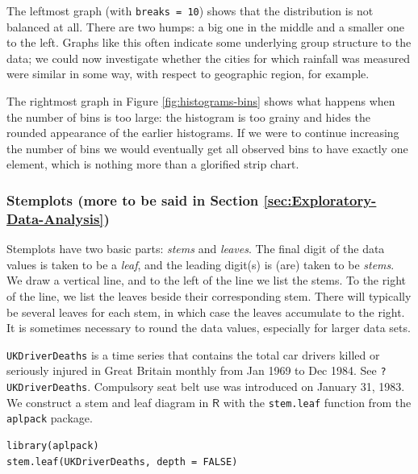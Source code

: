 \documentclass[captions=tableheading]{scrbook}
\begin{document}
\begin{example}
The leftmost graph (with \texttt{breaks = 10}) shows that the distribution is not balanced at all. There are two humps: a big one in the middle and a smaller one to the left. Graphs like this often indicate some underlying group structure to the data; we could now investigate whether the cities for which rainfall was measured were similar in some way, with respect to geographic region, for example.

The rightmost graph in Figure \ref{fig:histograms-bins} shows what happens when the number of bins is too large: the histogram is too grainy and hides the rounded appearance of the earlier histograms. If we were to continue increasing the number of bins we would eventually get all observed bins to have exactly one element, which is nothing more than a glorified strip chart.

\end{example}
\subsubsection{Stemplots (more to be said in Section \ref{sec:Exploratory-Data-Analysis})}
\label{sec-2-1-2-3}


Stemplots have two basic parts: \emph{stems} and \emph{leaves}. The final digit of the data values is taken to be a \emph{leaf}, and the leading digit(s) is (are) taken to be \emph{stems}. We draw a vertical line, and to the left of the line we list the stems. To the right of the line, we list the leaves beside their corresponding stem. There will typically be several leaves for each stem, in which case the leaves accumulate to the right. It is sometimes necessary to round the data values, especially for larger data sets.

\begin{example}
\label{exa:-ukdriverdeaths-first}
\texttt{UKDriverDeaths} is a time series that contains the total car drivers killed or seriously injured in Great Britain monthly from Jan 1969 to Dec 1984. See \texttt{?UKDriverDeaths}. Compulsory seat belt use was introduced on January 31, 1983. We construct a stem and leaf diagram in \(\mathsf{R}\) with the \texttt{stem.leaf} function from the \texttt{aplpack} package\cite{aplpack}.
\end{example}


\begin{verbatim}
library(aplpack)
stem.leaf(UKDriverDeaths, depth = FALSE)
\end{verbatim}
\end{document}
